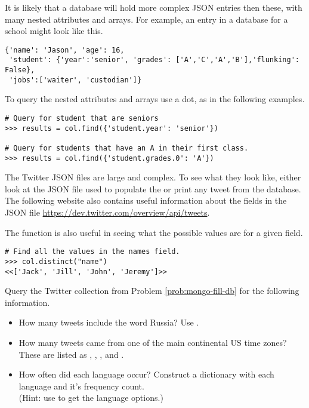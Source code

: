 It is likely that a database will hold more complex JSON entries then these, with many nested attributes and arrays.
For example, an entry in a database for a school might look like this.

\begin{lstlisting}
{'name': 'Jason', 'age': 16,
 'student': {'year':'senior', 'grades': ['A','C','A','B'],'flunking': False},
 'jobs':['waiter', 'custodian']}
\end{lstlisting}

To query the nested attributes and arrays use a dot, as in the following examples.

\begin{lstlisting}
# Query for student that are seniors
>>> results = col.find({'student.year': 'senior'})

# Query for students that have an A in their first class.
>>> results = col.find({'student.grades.0': 'A'})
\end{lstlisting}

The Twitter JSON files are large and complex.
To see what they look like, either look at the JSON file used to populate the  or print any tweet from the database.
The following website also contains useful information about the fields in the JSON file \url{https://dev.twitter.com/overview/api/tweets}.

The  function is also useful in seeing what the possible values are for a given field.

\begin{lstlisting}
# Find all the values in the names field.
>>> col.distinct("name")
<<['Jack', 'Jill', 'John', 'Jeremy']>>
\end{lstlisting}

\begin{problem}
Query the Twitter collection from Problem \ref{prob:mongo-fill-db} for the following information.
\begin{itemize}
    \item How many tweets include the word Russia? Use .
    \item How many tweets came from one of the main continental US time zones? These are listed as , , , and .
    \item How often did each language occur? Construct a dictionary with each language and it's frequency count.
    \\(Hint: use  to get the language options.)
\end{itemize}
\end{problem}

